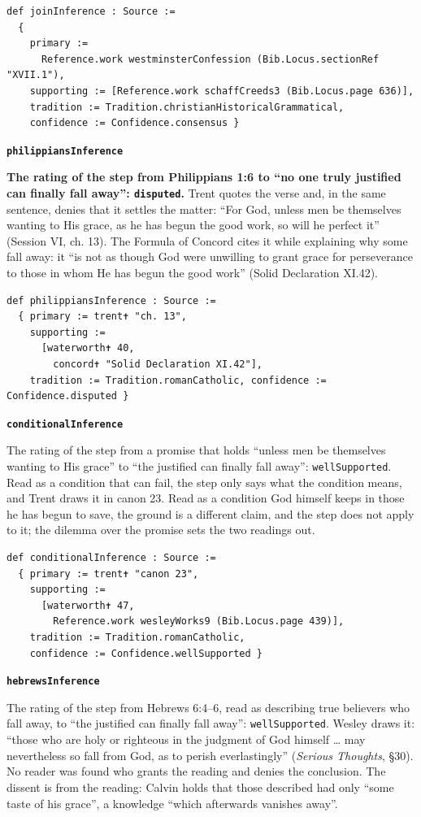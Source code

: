 \documentclass[11pt]{article}
\begin{document}
{\small\begin{verbatim}
def joinInference : Source :=
  {
    primary :=
      Reference.work westminsterConfession (Bib.Locus.sectionRef "XVII.1"),
    supporting := [Reference.work schaffCreeds3 (Bib.Locus.page 636)],
    tradition := Tradition.christianHistoricalGrammatical,
    confidence := Confidence.consensus }
\end{verbatim}}
\par\medskip\noindent\textbf{\texttt{philippians\allowbreak{}Inference}}\par\nobreak\noindent
\textbf{The rating of the step from Philippians 1:6 to “no one truly justified can finally fall away”: \texttt{disputed}.} Trent quotes the verse and, in the same sentence, denies that it settles the matter: “For God, unless men be themselves wanting to His grace, as he has begun the good work, so will he perfect it” (Session VI, ch. 13). The Formula of Concord cites it while explaining why some fall away: it “is not as though God were unwilling to grant grace for perseverance to those in whom He has begun the good work” (Solid Declaration XI.42).

{\small\begin{verbatim}
def philippiansInference : Source :=
  { primary := trent✝ "ch. 13",
    supporting :=
      [waterworth✝ 40,
        concord✝ "Solid Declaration XI.42"],
    tradition := Tradition.romanCatholic, confidence := Confidence.disputed }
\end{verbatim}}
\par\medskip\noindent\textbf{\texttt{conditional\allowbreak{}Inference}}\par\nobreak\noindent
The rating of the step from a promise that holds “unless men be themselves wanting to His grace” to “the justified can finally fall away”: \texttt{well\allowbreak{}Supported}. Read as a condition that can fail, the step only says what the condition means, and Trent draws it in canon 23. Read as a condition God himself keeps in those he has begun to save, the ground is a different claim, and the step does not apply to it; the dilemma over the promise sets the two readings out.

{\small\begin{verbatim}
def conditionalInference : Source :=
  { primary := trent✝ "canon 23",
    supporting :=
      [waterworth✝ 47,
        Reference.work wesleyWorks9 (Bib.Locus.page 439)],
    tradition := Tradition.romanCatholic,
    confidence := Confidence.wellSupported }
\end{verbatim}}
\par\medskip\noindent\textbf{\texttt{hebrews\allowbreak{}Inference}}\par\nobreak\noindent
The rating of the step from Hebrews 6:4–6, read as describing true believers who fall away, to “the justified can finally fall away”: \texttt{well\allowbreak{}Supported}. Wesley draws it: “those who are holy or righteous in the judgment of God himself … may nevertheless so fall from God, as to perish everlastingly” (\emph{Serious Thoughts}, §30). No reader was found who grants the reading and denies the conclusion. The dissent is from the reading: Calvin holds that those described had only “some taste of his grace”, a knowledge “which afterwards vanishes away”.
\end{document}
